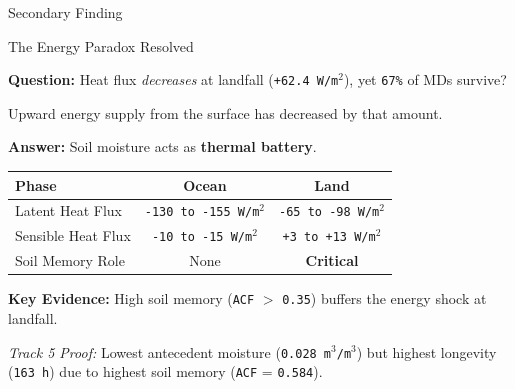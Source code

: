 \documentclass[8pt, aspectratio=169]{beamer}
\begin{document}
\begin{frame}{Secondary Finding}
    \vspace{-0.2cm}
    \begin{block}{The Energy Paradox Resolved}\end{block}

    \small
    \textbf{Question:} Heat flux \textit{decreases} at landfall (\texttt{+62.4 W/m$^2$}), yet \texttt{67\%} of MDs survive?

    \tiny
    \quad \quad Upward energy supply from the surface has decreased by that amount.

    \vspace{0.15cm}
    \footnotesize
    \textbf{Answer:} Soil moisture acts as \textbf{thermal battery}.
    
    \vspace{0.15cm}
    \footnotesize
    \begin{center}
    \begin{tabular}{l|cc}
        \toprule
        \textbf{Phase} & \textbf{Ocean} & \textbf{Land} \\
        \midrule
        Latent Heat Flux & \texttt{-130 to -155 W/m$^2$} & \texttt{-65 to -98 W/m$^2$} \\
        Sensible Heat Flux & \texttt{-10 to -15 W/m$^2$} & \texttt{+3 to +13 W/m$^2$} \\
        Soil Memory Role & None & \textbf{Critical} \\
        \bottomrule
    \end{tabular}
    \end{center}
 
    \vspace{0.1cm}
    \small
    \textbf{Key Evidence:} High soil memory (\texttt{ACF} $>$ \texttt{0.35}) buffers the energy shock at landfall.

    \vspace{0.08cm}
    \textit{Track 5 Proof:} Lowest antecedent moisture (\texttt{0.028 m$^3$/m$^3$}) but highest longevity (\texttt{163 h}) 
    due to highest soil memory (\texttt{ACF} = \texttt{0.584}).
\end{frame}
\end{document}
